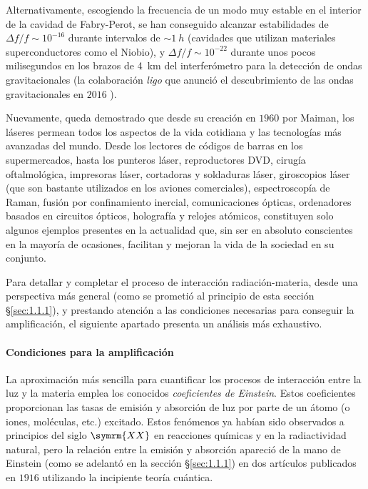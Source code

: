 Alternativamente, escogiendo la frecuencia de un modo muy estable en el interior de la cavidad de Fabry-Perot, se han conseguido alcanzar estabilidades de $\Delta f/f \sim 10^{-16}$ durante intervalos de $\sim \qty{1}{h}$ (cavidades que utilizan materiales superconductores como el Niobio\autocite{Stein1975}), y $\Delta f/f \sim 10^{-22}$ durante unos pocos milisegundos \autocite{Mueller2016,Kwee2012} en los brazos de \qty{4}{km} del interferómetro para la detección de ondas gravitacionales (la colaboración \emph{\acrfull{ligo}} que anunció el descubrimiento de las ondas gravitacionales en $2016$ \autocite{Abbott2016}).

Nuevamente, queda demostrado que desde su creación en $1960$ por Maiman, los láseres permean todos los aspectos de la vida cotidiana y las tecnologías más avanzadas del mundo. Desde los lectores de códigos de barras en los supermercados, hasta los punteros láser, reproductores DVD, cirugía oftalmológica, impresoras láser, cortadoras y soldaduras láser, giroscopios láser (que son bastante utilizados en los aviones comerciales), espectroscopía de Raman, fusión por confinamiento inercial, comunicaciones ópticas, ordenadores basados en circuitos ópticos, holografía y relojes atómicos, constituyen solo algunos ejemplos presentes en la actualidad que, sin ser en absoluto conscientes en la mayoría de ocasiones, facilitan y mejoran la vida de la sociedad en su conjunto.

Para detallar y completar el proceso de interacción radiación-materia, desde una perspectiva más general (como se prometió al principio de esta sección \S\ref{sec:1.1.1}), y prestando atención a las condiciones necesarias para conseguir la amplificación, el siguiente apartado presenta un análisis más exhaustivo. 

\paragraph{Condiciones para la amplificación}
La aproximación más sencilla \autocite{Schwartz2013} para cuantificar los procesos de interacción entre la luz y la materia emplea los conocidos \emph{coeficientes de Einstein}. Estos coeficientes proporcionan las tasas de emisión y absorción de luz por parte de un átomo (o iones, moléculas, etc.) excitado. Estos fenómenos ya habían sido observados a principios del siglo $\symrm{XX}$ en reacciones químicas y en la radiactividad natural, pero la relación entre la emisión y absorción apareció de la mano de Einstein (como se adelantó en la sección \S\ref{sec:1.1.1}) en dos artículos \autocite{Einstein1916,Einstein1916a} publicados en $1916$ utilizando la incipiente teoría cuántica.

